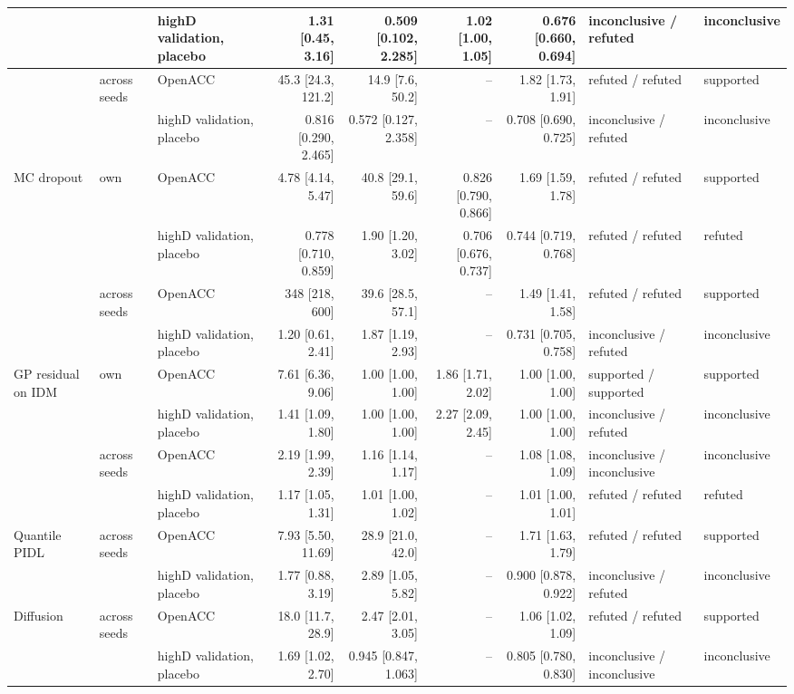 \begin{table}[htbp]
\begin{tabular}{lllrrrrll}
 &  & highD validation, placebo & 1.31 [0.45, 3.16] & 0.509 [0.102, 2.285] & 1.02 [1.00, 1.05] & 0.676 [0.660, 0.694] & inconclusive / refuted & inconclusive \\
\midrule
 & across seeds & OpenACC & 45.3 [24.3, 121.2] & 14.9 [7.6, 50.2] & -- & 1.82 [1.73, 1.91] & refuted / refuted & supported \\
 &  & highD validation, placebo & 0.816 [0.290, 2.465] & 0.572 [0.127, 2.358] & -- & 0.708 [0.690, 0.725] & inconclusive / refuted & inconclusive \\
\midrule
MC dropout & own & OpenACC & 4.78 [4.14, 5.47] & 40.8 [29.1, 59.6] & 0.826 [0.790, 0.866] & 1.69 [1.59, 1.78] & refuted / refuted & supported \\
 &  & highD validation, placebo & 0.778 [0.710, 0.859] & 1.90 [1.20, 3.02] & 0.706 [0.676, 0.737] & 0.744 [0.719, 0.768] & refuted / refuted & refuted \\
\midrule
 & across seeds & OpenACC & 348 [218, 600] & 39.6 [28.5, 57.1] & -- & 1.49 [1.41, 1.58] & refuted / refuted & supported \\
 &  & highD validation, placebo & 1.20 [0.61, 2.41] & 1.87 [1.19, 2.93] & -- & 0.731 [0.705, 0.758] & inconclusive / refuted & inconclusive \\
\midrule
GP residual on IDM & own & OpenACC & 7.61 [6.36, 9.06] & 1.00 [1.00, 1.00] & 1.86 [1.71, 2.02] & 1.00 [1.00, 1.00] & supported / supported & supported \\
 &  & highD validation, placebo & 1.41 [1.09, 1.80] & 1.00 [1.00, 1.00] & 2.27 [2.09, 2.45] & 1.00 [1.00, 1.00] & inconclusive / refuted & inconclusive \\
\midrule
 & across seeds & OpenACC & 2.19 [1.99, 2.39] & 1.16 [1.14, 1.17] & -- & 1.08 [1.08, 1.09] & inconclusive / inconclusive & inconclusive \\
 &  & highD validation, placebo & 1.17 [1.05, 1.31] & 1.01 [1.00, 1.02] & -- & 1.01 [1.00, 1.01] & refuted / refuted & refuted \\
\midrule
Quantile PIDL & across seeds & OpenACC & 7.93 [5.50, 11.69] & 28.9 [21.0, 42.0] & -- & 1.71 [1.63, 1.79] & refuted / refuted & supported \\
 &  & highD validation, placebo & 1.77 [0.88, 3.19] & 2.89 [1.05, 5.82] & -- & 0.900 [0.878, 0.922] & inconclusive / refuted & inconclusive \\
\midrule
Diffusion & across seeds & OpenACC & 18.0 [11.7, 28.9] & 2.47 [2.01, 3.05] & -- & 1.06 [1.02, 1.09] & refuted / refuted & supported \\
 &  & highD validation, placebo & 1.69 [1.02, 2.70] & 0.945 [0.847, 1.063] & -- & 0.805 [0.780, 0.830] & inconclusive / inconclusive & inconclusive \\
\bottomrule
\end{tabular}
\end{table}
